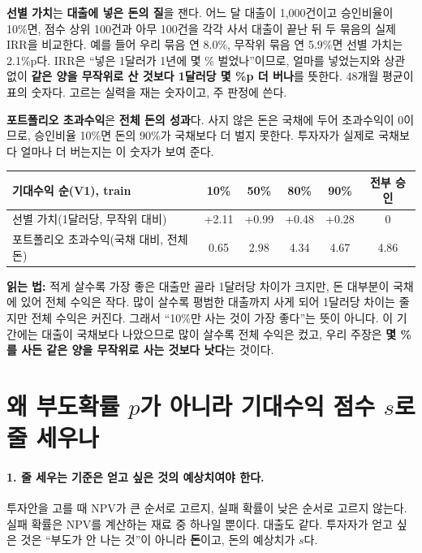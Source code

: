 \begin{formulabox}
\textbf{선별 가치}는 \textbf{대출에 넣은 돈의 질}을 잰다. 어느 달 대출이 1,000건이고 승인비율이 10\%면, 점수 상위 100건과 아무 100건을 각각 사서 대출이 끝난 뒤 두 묶음의 실제 IRR을 비교한다. 예를 들어 우리 묶음 연 8.0\%, 무작위 묶음 연 5.9\%면 선별 가치는 2.1\%p다. IRR은 ``넣은 1달러가 1년에 몇 \% 벌었나''이므로, 얼마를 넣었는지와 상관없이 \textbf{같은 양을 무작위로 산 것보다 1달러당 몇 \%p 더 버나}를 뜻한다. 48개월 평균이 표의 숫자다. 고르는 실력을 재는 숫자이고, 주 판정에 쓴다.

\textbf{포트폴리오 초과수익}은 \textbf{전체 돈의 성과}다. 사지 않은 돈은 국채에 두어 초과수익이 0이므로, 승인비율 10\%면 돈의 90\%가 국채보다 더 벌지 못한다. 투자자가 실제로 국채보다 얼마나 더 버는지는 이 숫자가 보여 준다.

\smallskip
\centering\small
\begin{tabular}{@{}lccccc@{}}\toprule
기대수익 순(V1), train & 10\% & 50\% & 80\% & 90\% & 전부 승인\\\midrule
선별 가치(1달러당, 무작위 대비) & +2.11 & +0.99 & +0.48 & +0.28 & 0\\
포트폴리오 초과수익(국채 대비, 전체 돈) & 0.65 & 2.98 & 4.34 & 4.67 & 4.86\\\bottomrule
\end{tabular}

\raggedright
\smallskip
\textbf{읽는 법:} 적게 살수록 가장 좋은 대출만 골라 1달러당 차이가 크지만, 돈 대부분이 국채에 있어 전체 수익은 작다. 많이 살수록 평범한 대출까지 사게 되어 1달러당 차이는 줄지만 전체 수익은 커진다. 그래서 ``10\%만 사는 것이 가장 좋다''는 뜻이 아니다. 이 기간에는 대출이 국채보다 나았으므로 많이 살수록 전체 수익은 컸고, 우리 주장은 \textbf{몇 \%를 사든 같은 양을 무작위로 사는 것보다 낫다}는 것이다.
\end{formulabox}

\section{왜 부도확률 $p$가 아니라 기대수익 점수 $s$로 줄 세우나}

\paragraph{1. 줄 세우는 기준은 얻고 싶은 것의 예상치여야 한다.}
투자안을 고를 때 NPV가 큰 순서로 고르지, 실패 확률이 낮은 순서로 고르지 않는다. 실패 확률은 NPV를 계산하는 재료 중 하나일 뿐이다. 대출도 같다. 투자자가 얻고 싶은 것은 ``부도가 안 나는 것''이 아니라 \textbf{돈}이고, 돈의 예상치가 $s$다.

